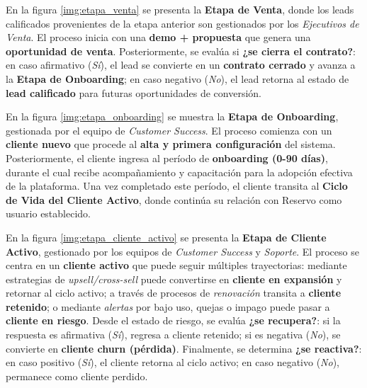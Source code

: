 En la figura \ref{img:etapa_venta} se presenta la \textbf{Etapa de Venta}, donde los leads calificados provenientes de la etapa anterior son gestionados por los \textit{Ejecutivos de Venta}. El proceso inicia con una \textbf{demo + propuesta} que genera una \textbf{oportunidad de venta}. Posteriormente, se evalúa si \textbf{¿se cierra el contrato?}: en caso afirmativo (\textit{Sí}), el lead se convierte en un \textbf{contrato cerrado} y avanza a la \textbf{Etapa de Onboarding}; en caso negativo (\textit{No}), el lead retorna al estado de \textbf{lead calificado} para futuras oportunidades de conversión.

En la figura \ref{img:etapa_onboarding} se muestra la \textbf{Etapa de Onboarding}, gestionada por el equipo de \textit{Customer Success}. El proceso comienza con un \textbf{cliente nuevo} que procede al \textbf{alta y primera configuración} del sistema. Posteriormente, el cliente ingresa al período de \textbf{onboarding (0-90 días)}, durante el cual recibe acompañamiento y capacitación para la adopción efectiva de la plataforma. Una vez completado este período, el cliente transita al \textbf{Ciclo de Vida del Cliente Activo}, donde continúa su relación con Reservo como usuario establecido.

En la figura \ref{img:etapa_cliente_activo} se presenta la \textbf{Etapa de Cliente Activo}, gestionado por los equipos de \textit{Customer Success} y \textit{Soporte}. El proceso se centra en un \textbf{cliente activo} que puede seguir múltiples trayectorias: mediante estrategias de \textit{upsell/cross-sell} puede convertirse en \textbf{cliente en expansión} y retornar al ciclo activo; a través de procesos de \textit{renovación} transita a \textbf{cliente retenido}; o mediante \textit{alertas} por bajo uso, quejas o impago puede pasar a \textbf{cliente en riesgo}. Desde el estado de riesgo, se evalúa \textbf{¿se recupera?}: si la respuesta es afirmativa (\textit{Sí}), regresa a cliente retenido; si es negativa (\textit{No}), se convierte en \textbf{cliente churn (pérdida)}. Finalmente, se determina \textbf{¿se reactiva?}: en caso positivo (\textit{Sí}), el cliente retorna al ciclo activo; en caso negativo (\textit{No}), permanece como cliente perdido.

